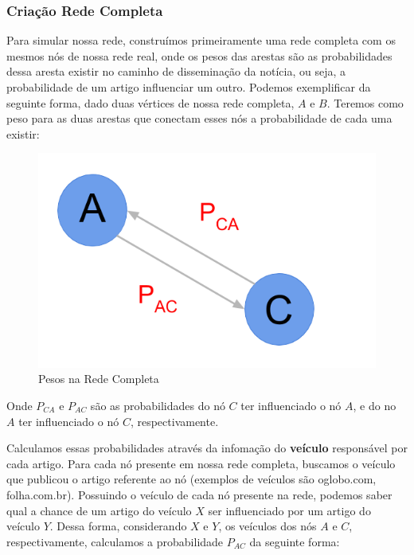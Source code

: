 \documentclass[a4paper,12pt]{article}
\begin{document}
\pagebreak
\subsubsection{Criação Rede Completa}


 Para simular nossa rede, construímos primeiramente uma rede completa com os mesmos nós de nossa rede real, onde os pesos das arestas
 são as probabilidades dessa aresta existir no caminho de disseminação da notícia, ou seja, a probabilidade de um artigo influenciar um 
 outro. Podemos exemplificar da seguinte forma, dado duas vértices de nossa rede completa, $A$ e $B$. Teremos como peso para as duas 
 arestas que conectam esses nós a probabilidade de cada uma existir:
 
 \begin{figure}[ht]
 \centering
 \includegraphics[scale=0.3]{./rede5.png}
 \caption{Pesos na Rede Completa}
\end{figure}

 Onde $P_{CA}$ e $P_{AC}$ são as probabilidades do nó $C$ ter influenciado o nó $A$, e do no $A$ ter influenciado o nó $C$, 
 respectivamente.

 Calculamos essas probabilidades através da infomação do \textbf{veículo} responsável por cada artigo. Para cada nó presente em nossa rede completa,
 buscamos o veículo que publicou o artigo referente ao nó (exemplos de veículos são oglobo.com, folha.com.br). Possuindo o veículo de cada
 nó presente na rede, podemos saber qual a chance de um artigo do veículo $X$ ser influenciado por um artigo do veículo $Y$. Dessa forma, 
 considerando $X$ e $Y$, os veículos dos nós $A$ e $C$, respectivamente, calculamos a probabilidade $P_{AC}$ da seguinte forma:
 
\end{document}
